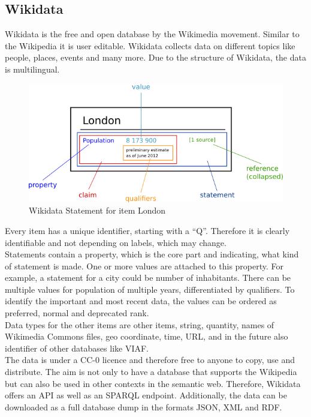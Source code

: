 \subsection{Wikidata}
Wikidata is the free and open database by the Wikimedia movement. Similar to the Wikipedia it is user editable. Wikidata collects data on different topics like people, places, events and many more. Due to the structure of Wikidata, the data is multilingual.
\begin{figure}[ht]
	\centering
	\includegraphics[width=120mm]{diagrams/Wikidata_statement.png}
	\caption{Wikidata Statement for item London}
	\label{fig1}
\end{figure}

Every item has a unique identifier, starting with a ``Q''. Therefore it is clearly identifiable and not depending on labels, which may change. \\
Statements contain a property, which is the core part and indicating, what kind of statement is made. One or more values are attached to this property. For example, a statement for a city could be number of inhabitants. There can be multiple values for population of multiple years, differentiated by qualifiers. To identify the important and most recent data, the values can be ordered as preferred, normal and deprecated rank.\\
Data types for the other items are other items, string, quantity, names of Wikimedia Commons files, geo coordinate, time, URL,  and in the future also identifier of other databases like VIAF. \\
The data is under a CC-0 licence and therefore free to anyone to copy, use and distribute.
The aim is not only to have a database that supports the Wikipedia but can also be used in other contexts in the semantic web. Therefore, Wikidata offers an API as well as an SPARQL endpoint. Additionally, the data can be downloaded as a full database dump in the formats JSON, XML and RDF.  